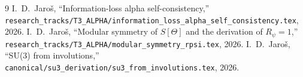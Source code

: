 \documentclass[12pt,a4paper]{article}
\theoremstyle{definition}\newtheorem{definition}[theorem]{Definition}
\theoremstyle{remark}\newtheorem{remark}[theorem]{Remark}
\begin{document}
\begin{thebibliography}{9}
  I.~D.~Jaroš,
  ``Information-loss alpha self-consistency,''
  \texttt{research\_tracks/T3\_ALPHA/information\_loss\_alpha\_self\_consistency.tex}, 2026.
  I.~D.~Jaroš,
  ``Modular symmetry of $S[\Theta]$ and the derivation of $R_\psi=1$,''
  \texttt{research\_tracks/T3\_ALPHA/modular\_symmetry\_rpsi.tex}, 2026.
  I.~D.~Jaroš,
  ``SU(3) from involutions,''
  \texttt{canonical/su3\_derivation/su3\_from\_involutions.tex}, 2026.
\end{thebibliography}

\ifdefined\INCLUDEMODE\else
\end{document}
